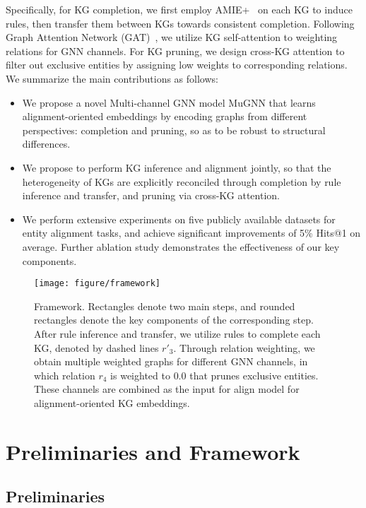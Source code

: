 \documentclass[11pt,a4paper]{article}
\begin{document}
Specifically, for KG completion, we first employ AMIE+~\cite{galarraga2015fast} on each KG to induce rules, then transfer them between KGs towards consistent completion. Following Graph Attention Network (GAT)~\cite{velivckovic2018graph}, we utilize KG self-attention to weighting relations for GNN channels. For KG pruning, we design cross-KG attention to filter out exclusive entities by assigning low weights to corresponding relations. We summarize the main contributions as follows:

\begin{itemize}
	\item We propose a novel Multi-channel GNN model MuGNN that learns alignment-oriented embeddings by encoding graphs from different perspectives: completion and pruning, so as to be robust to structural differences.

	\item We propose to perform KG inference and alignment jointly, so that the heterogeneity of KGs are explicitly reconciled through completion by rule inference and transfer, and pruning via cross-KG attention.

	\item We perform extensive experiments on five publicly available datasets for entity alignment tasks, and achieve significant improvements of 5\% Hits@1 on average. Further ablation study demonstrates the effectiveness of our key components.
\end{itemize}

\begin{figure*}[htb]
	\centerline{\texttt{[image: figure/framework]}}
	\caption{Framework. Rectangles denote two main steps, and rounded rectangles denote the key components of the corresponding step. After rule inference and transfer, we utilize rules to complete each KG, denoted by dashed lines $r'_3$. Through relation weighting, we obtain multiple weighted graphs for different GNN channels, in which relation $r_4$ is weighted to $0.0$ that prunes exclusive entities. These channels are combined as the input for align model for alignment-oriented KG embeddings.}
	\label{fig:framework}
\end{figure*}

\section{Preliminaries and Framework}
\subsection{Preliminaries}
\end{document}
